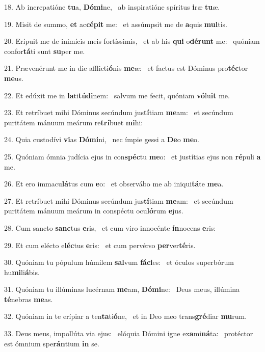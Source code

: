 18. Ab increpatióne \textbf{tu}a, \textbf{Dó}\textbf{mi}ne, \ast\  ab inspiratióne spíritus \textbf{i}ræ \textbf{tu}æ.\

19. Misit de summo, \textbf{et} ac\textbf{cé}\textbf{pit} me: \ast\  et assúmpsit me de \textbf{a}quis \textbf{mul}tis.\

20. Erípuit me de inimícis meis fortíssimis, \dag\  et ab his \textbf{qui} o\textbf{dé}\textbf{runt} me: \ast\  quóniam confor\textbf{tá}ti sunt \textbf{su}per me.\

21. Prævenérunt me in die afflicti\textbf{ó}nis \textbf{me}æ: \ast\  et factus est Dóminus pro\textbf{téc}tor \textbf{me}us.\

22. Et edúxit me in \textbf{la}ti\textbf{tú}\textbf{di}nem: \ast\  salvum me fecit, quóniam \textbf{vó}lu\textbf{it} me.\

23. Et retríbuet mihi Dóminus secúndum jus\textbf{tí}tiam \textbf{me}am: \ast\  et secúndum puritátem mánuum meárum re\textbf{trí}buet \textbf{mi}hi:\

24. Quia custodívi \textbf{vi}as \textbf{Dó}\textbf{mi}ni, \ast\  nec ímpie gessi a \textbf{De}o \textbf{me}o.\

25. Quóniam ómnia judícia ejus in con\textbf{spéc}tu \textbf{me}o: \ast\  et justítias ejus non \textbf{ré}puli \textbf{a} me.\

26. Et ero immacu\textbf{lá}tus cum \textbf{e}o: \ast\  et observábo me ab iniqui\textbf{tá}te \textbf{me}a.\

27. Et retríbuet mihi Dóminus secúndum jus\textbf{tí}tiam \textbf{me}am: \ast\  et secúndum puritátem mánuum meárum in conspéctu ocu\textbf{ló}rum \textbf{e}jus.\

28. Cum sancto \textbf{sanc}tus \textbf{e}ris, \ast\  et cum viro innocénte \textbf{ín}nocens \textbf{e}ris:\

29. Et cum elécto e\textbf{léc}tus \textbf{e}ris: \ast\  et cum pervérso \textbf{per}ver\textbf{té}ris.\

30. Quóniam tu pópulum húmilem \textbf{sal}vum \textbf{fá}\textbf{ci}es: \ast\  et óculos superbórum hu\textbf{mi}li\textbf{á}bis.\

31. Quóniam tu illúminas lucérnam \textbf{me}am, \textbf{Dó}\textbf{mi}ne: \ast\  Deus meus, illúmina \textbf{té}nebras \textbf{me}as.\

32. Quóniam in te erípiar a ten\textbf{ta}ti\textbf{ó}ne, \ast\  et in Deo meo trans\textbf{gré}diar \textbf{mu}rum.\

33. Deus meus, impollúta via ejus: \dag\  elóquia Dómini igne ex\textbf{a}mi\textbf{ná}ta: \ast\  protéctor est ómnium spe\textbf{rán}tium \textbf{in} se.\


